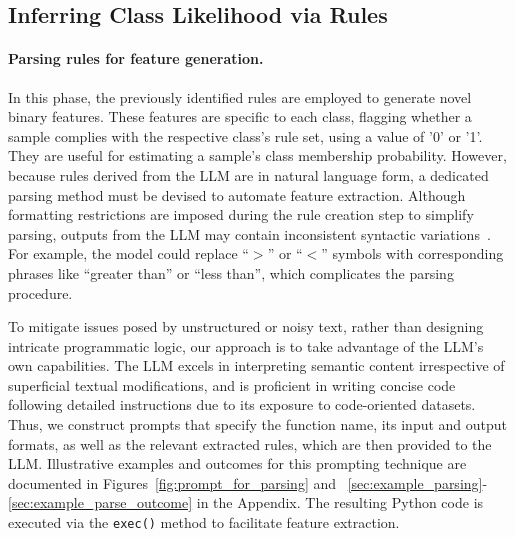 \subsection{Inferring Class Likelihood via Rules}
\label{Sec:training}

\paragraph{Parsing rules for feature generation.} In this phase, the previously identified rules are employed to generate novel binary features. These features are specific to each class, flagging whether a sample complies with the respective class's rule set, using a value of '0' or '1'. They are useful for estimating a sample's class membership probability. However, because rules derived from the LLM are in natural language form, a dedicated parsing method must be devised to automate feature extraction. Although formatting restrictions are imposed during the rule creation step to simplify parsing, outputs from the LLM may contain inconsistent syntactic variations~\cite{kovavc2023large}. For example, the model could replace ``$>$” or ``$<$” symbols with corresponding phrases like ``greater than'' or ``less than'', which complicates the parsing procedure. 

To mitigate issues posed by unstructured or noisy text, rather than designing intricate programmatic logic, our approach is to take advantage of the LLM's own capabilities. The LLM excels in interpreting semantic content irrespective of superficial textual modifications, and is proficient in writing concise code following detailed instructions due to its exposure to code-oriented datasets. Thus, we construct prompts that specify the function name, its input and output formats, as well as the relevant extracted rules, which are then provided to the LLM. Illustrative examples and outcomes for this prompting technique are documented in Figures~\ref{fig:prompt_for_parsing} and ~\ref{sec:example_parsing}-\ref{sec:example_parse_outcome} in the Appendix. The resulting Python code is executed via the \texttt{exec()} method to facilitate feature extraction.

\vspace*{-0.12in}
